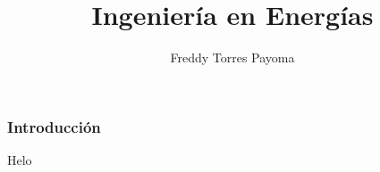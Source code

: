 \documentclass[11pt]{beamer}
\begin{document}
	\author{Freddy Torres Payoma}
	\title{Ingeniería en Energías}
	\begin{frame}[plain]
		\maketitle
	\end{frame}
	
	\begin{frame}
		\frametitle{Introducción}
		Helo
	\end{frame}
\end{document}
